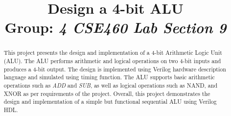 \documentclass[conference]{IEEEtran}
\begin{document}
    \title{Design a 4-bit ALU\\
    {\footnotesize Group: \textit{4 CSE460 Lab Section 9}}
    }

    \author{
    \and

    \and

    \and

    \and

    }

    \maketitle

    \begin{abstract}
        This project presents the design and implementation of a 4-bit Arithmetic Logic Unit (ALU).
        The ALU performs arithmetic and logical operations on two 4-bit inputs and produces a 4-bit output.
        The design is implemented using Verilog hardware description language and simulated using timing function.
        The ALU supports basic arithmetic operations such as \textit{ADD} and \textit{SUB},
        as well as logical operations such as NAND, and XNOR
        as per requirements of the project.
        Overall, this project demonstrates the design and implementation of a simple but
        functional sequential ALU using Verilog HDL.
    \end{abstract}
\end{document}
